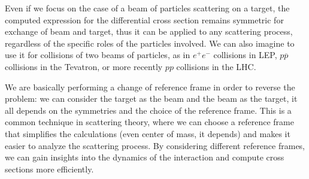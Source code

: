 Even if we focus on the case of a beam of particles scattering on a target, the computed expression for the differential cross section remains symmetric for exchange of beam and target, thus it can be applied to any scattering process, regardless of the specific roles of the particles involved. We can also imagine to use it for collisions of two beams of particles, as in \(e^+ e^-\) collisions in LEP, \(p \overline{p}\) collisions in the Tevatron, or more recently \(pp\) collisions in the LHC.

We are basically performing a change of reference frame in order to reverse the problem: we can consider the target as the beam and the beam as the target, it all depends on the symmetries and the choice of the reference frame. This is a common technique in scattering theory, where we can choose a reference frame that simplifies the calculations (even center of mass, it depends) and makes it easier to analyze the scattering process. By considering different reference frames, we can gain insights into the dynamics of the interaction and compute cross sections more efficiently.

